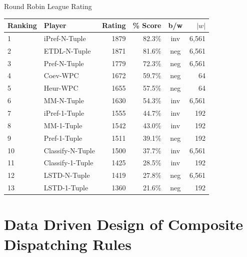 \documentclass[compress]{beamer}
\begin{document}
\begin{frame}{Round Robin League Rating}

\begin{tabular}{|l|l|rr|c|r|}
\hline
Ranking & Player & Rating & \% Score   & b/w  & $|w|$   \\ \hline
1 & iPref-N-Tuple    & 1879 & 82.3\%   & inv  & 6,561   \\     
2 & ETDL-N-Tuple     & 1871	& 81.6\%   & neg  & 6,561   \\  
3 & Pref-N-Tuple     & 1779	& 72.3\%   & neg  & 6,561   \\
4 & Coev-WPC         & 1672	& 59.7\%   & neg  &    64   \\
5 & Heur-WPC         & 1655	& 57.5\%   & neg  &    64   \\
6 & MM-N-Tuple       & 1630	& 54.3\%   & inv  & 6,561   \\
7 & iPref-1-Tuple    & 1555 & 44.7\%   & inv  &   192   \\
8 & MM-1-Tuple       & 1542	& 43.0\%   & inv  &   192   \\
9 & Pref-1-Tuple     & 1511	& 39.1\%   & neg  &   192   \\
10 & Classify-N-Tuple & 1500 & 37.7\%  & inv  & 6,561 \\
11 & Classify-1-Tuple & 1425 & 28.5\%  & inv  &   192    \\ 
12 & LSTD-N-Tuple    & 1419	& 27.8\%   & neg  & 6,561   \\
13 & LSTD-1-Tuple    & 1360	& 21.6\%   & neg  &   192   \\ \hline
\end{tabular}


%




\end{frame}


\section{Data Driven Design of Composite Dispatching Rules}
\end{document}
